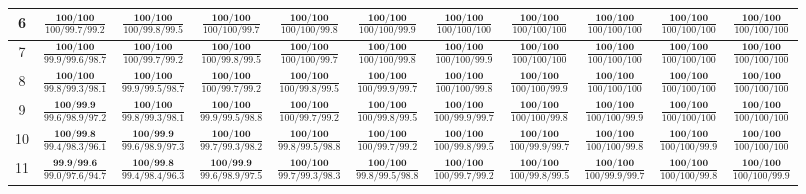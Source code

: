 \documentclass{slides}
\begin{document}
{{{\begin{tabular}{|c|c|c|c|c|c|c|c|c|c|c|}
\hline
6 & $\frac{\textbf{100/100}}{100/99.7/99.2}$ & $\frac{\textbf{100/100}}{100/99.8/99.5}$ & $\frac{\textbf{100/100}}{100/100/99.7}$ & $\frac{\textbf{100/100}}{100/100/99.8}$ & $\frac{\textbf{100/100}}{100/100/99.9}$ & $\frac{\textbf{100/100}}{100/100/100}$ & $\frac{\textbf{100/100}}{100/100/100}$ & $\frac{\textbf{100/100}}{100/100/100}$ & $\frac{\textbf{100/100}}{100/100/100}$ & $\frac{\textbf{100/100}}{100/100/100}$ \\
\hline
7 & $\frac{\textbf{100/100}}{99.9/99.6/98.7}$ & $\frac{\textbf{100/100}}{100/99.7/99.2}$ & $\frac{\textbf{100/100}}{100/99.8/99.5}$ & $\frac{\textbf{100/100}}{100/100/99.7}$ & $\frac{\textbf{100/100}}{100/100/99.8}$ & $\frac{\textbf{100/100}}{100/100/99.9}$ & $\frac{\textbf{100/100}}{100/100/100}$ & $\frac{\textbf{100/100}}{100/100/100}$ & $\frac{\textbf{100/100}}{100/100/100}$ & $\frac{\textbf{100/100}}{100/100/100}$ \\
\hline
8 & $\frac{\textbf{100/100}}{99.8/99.3/98.1}$ & $\frac{\textbf{100/100}}{99.9/99.5/98.7}$ & $\frac{\textbf{100/100}}{100/99.7/99.2}$ & $\frac{\textbf{100/100}}{100/99.8/99.5}$ & $\frac{\textbf{100/100}}{100/99.9/99.7}$ & $\frac{\textbf{100/100}}{100/100/99.8}$ & $\frac{\textbf{100/100}}{100/100/99.9}$ & $\frac{\textbf{100/100}}{100/100/100}$ & $\frac{\textbf{100/100}}{100/100/100}$ & $\frac{\textbf{100/100}}{100/100/100}$ \\
\hline
9 & $\frac{\textbf{100/99.9}}{99.6/98.9/97.2}$ & $\frac{\textbf{100/100}}{99.8/99.3/98.1}$ & $\frac{\textbf{100/100}}{99.9/99.5/98.8}$ & $\frac{\textbf{100/100}}{100/99.7/99.2}$ & $\frac{\textbf{100/100}}{100/99.8/99.5}$ & $\frac{\textbf{100/100}}{100/99.9/99.7}$ & $\frac{\textbf{100/100}}{100/100/99.8}$ & $\frac{\textbf{100/100}}{100/100/99.9}$ & $\frac{\textbf{100/100}}{100/100/100}$ & $\frac{\textbf{100/100}}{100/100/100}$ \\
\hline
10 & $\frac{\textbf{100/99.8}}{99.4/98.3/96.1}$ & $\frac{\textbf{100/99.9}}{99.6/98.9/97.3}$ & $\frac{\textbf{100/100}}{99.7/99.3/98.2}$ & $\frac{\textbf{100/100}}{99.8/99.5/98.8}$ & $\frac{\textbf{100/100}}{100/99.7/99.2}$ & $\frac{\textbf{100/100}}{100/99.8/99.5}$ & $\frac{\textbf{100/100}}{100/99.9/99.7}$ & $\frac{\textbf{100/100}}{100/100/99.8}$ & $\frac{\textbf{100/100}}{100/100/99.9}$ & $\frac{\textbf{100/100}}{100/100/100}$ \\
\hline
11 & $\frac{\textbf{99.9/99.6}}{99.0/97.6/94.7}$ & $\frac{\textbf{100/99.8}}{99.4/98.4/96.3}$ & $\frac{\textbf{100/99.9}}{99.6/98.9/97.5}$ & $\frac{\textbf{100/100}}{99.7/99.3/98.3}$ & $\frac{\textbf{100/100}}{99.8/99.5/98.8}$ & $\frac{\textbf{100/100}}{100/99.7/99.2}$ & $\frac{\textbf{100/100}}{100/99.8/99.5}$ & $\frac{\textbf{100/100}}{100/99.9/99.7}$ & $\frac{\textbf{100/100}}{100/100/99.8}$ & $\frac{\textbf{100/100}}{100/100/99.9}$ \\

\end{tabular}}}}
\end{document}
